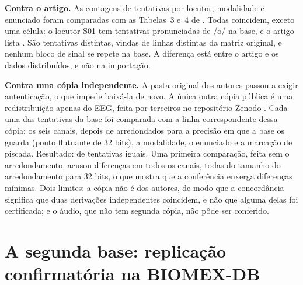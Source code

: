 			\par \textbf{Contra o artigo.} As contagens de tentativas por locutor, modalidade e enunciado foram comparadas com as Tabelas~3 e~4 de . Todas coincidem, exceto uma célula: o locutor S01 tem  tentativas pronunciadas de /o/ na base, e o artigo lista . São tentativas distintas, vindas de linhas distintas da matriz original, e nenhum bloco de sinal se repete na base. A diferença está entre o artigo e os dados distribuídos, e não na importação.

			\par \textbf{Contra uma cópia independente.} A pasta original dos autores passou a exigir autenticação, o que impede baixá-la de novo. A única outra cópia pública é uma redistribuição apenas do \ac{EEG}, feita por terceiros no repositório Zenodo \cite{pressel2026zenodo}. Cada uma das  tentativas da base foi comparada com a linha correspondente dessa cópia: os seis canais, depois de arredondados para a precisão em que a base os guarda (ponto flutuante de 32 bits), a modalidade, o enunciado e a marcação de piscada. Resultado:  de  tentativas iguais. Uma primeira comparação, feita sem o arredondamento, acusou diferenças em todos os canais, todas do tamanho do arredondamento para 32 bits, o que mostra que a conferência enxerga diferenças mínimas. Dois limites: a cópia não é dos autores, de modo que a concordância significa que duas derivações independentes coincidem, e não que alguma delas foi certificada; e o áudio, que não tem segunda cópia, não pôde ser conferido.

	\section{A segunda base: replicação confirmatória na BIOMEX-DB}
		\label{sec:biomex}

